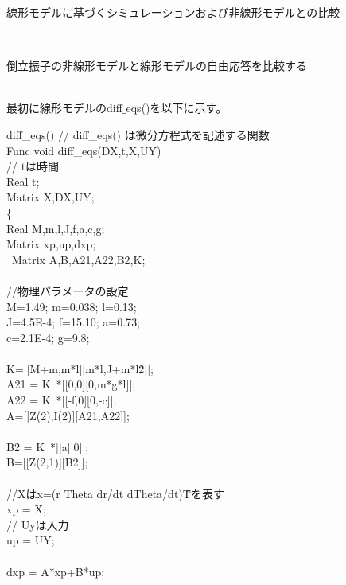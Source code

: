 \documentclass{jarticle}
\begin{document}
\begin{enumerate}
\begin{enumerate}
\begin{enumerate}
				
			\end{enumerate}
			{\Large\item 線形モデルに基づくシミュレーションおよび非線形モデルとの比較}\\
			\begin{enumerate}
				{\large\item 倒立振子の非線形モデルと線形モデルの自由応答を比較する}\\
				
					最初に線形モデルのdiff$\_$eqs()を以下に示す。\\
					\begin{itembox}[l]{diff\_eqs()}
						// diff\_eqs() は微分方程式を記述する関数\\
						Func void diff\_eqs(DX,t,X,UY)\\
						// tは時間\\
						Real t;\\
						Matrix X,DX,UY;\\
						\{\\
							Real M,m,l,J,f,a,c,g;\\
							Matrix xp,up,dxp;\\\
							Matrix A,B,A21,A22,B2,K;\\
						\\
							//物理パラメータの設定\\
							M=1.49;        m=0.038; l=0.13;\\
							J=4.5E-4; f=15.10; a=0.73;\\
							c=2.1E-4; g=9.8;\\
							\\
							K=[[M+m,m*l][m*l,J+m*l\^2]];\\
							A21 = K~*[[0,0][0,m*g*l]];	\\
							A22 = K~*[[-f,0][0,-c]];\\
							A=[[Z(2),I(2)][A21,A22]];\\
							\\
							B2 = K~*[[a][0]];\\
							B=[[Z(2,1)][B2]];\\
							\\
							//Xはx=(r Theta dr/dt dTheta/dt)\^Tを表す\\
							xp = X;\\
							// Uyは入力\\
							up = UY;\\
							\\
							dxp = A*xp+B*up;\\
							\\

\end{itembox}
\end{enumerate}
\end{enumerate}
\end{enumerate}
\end{document}
